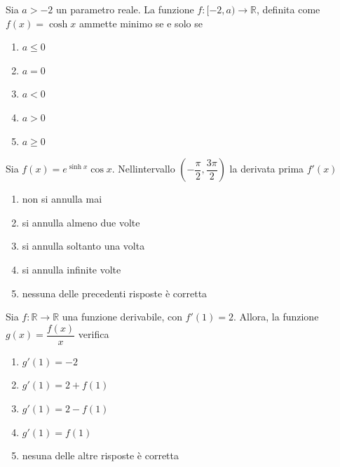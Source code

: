 \begin{quiz}
Sia $a>-2$ un parametro reale. La funzione $f:[-2,a)\to\mathbb R$, definita come $f(x)=\cosh x$ ammette minimo se e solo se
\begin{enumerate}
\item $a\le0$
\item $a=0$
\item $a<0$
\item $a>0$
\item $a\ge0$
\end{enumerate}
\end{quiz}

\begin{quiz}
Sia $f(x)=e^{\sinh x}\cos x$. Nell\textquotesingle intervallo $\left(-\dfrac\pi2,\dfrac{3\pi}2\right)$ la derivata prima $f\prime(x)$
\begin{enumerate}
\item non si annulla mai
\item si annulla almeno due volte
\item si annulla soltanto una volta
\item si annulla infinite volte
\item nessuna delle precedenti risposte \`e corretta
\end{enumerate}
\end{quiz}

\begin{quiz}
Sia $f:\mathbb R\to\mathbb R$ una funzione derivabile, con $f\prime(1)=2$. Allora, la funzione $g(x)=\dfrac{f(x)}x$ verifica
\begin{enumerate}
\item $g\prime(1)=-2$
\item $g\prime(1)=2+f(1)$
\item $g\prime(1)=2-f(1)$
\item $g\prime(1)=f(1)$
\item nesuna delle altre risposte \`e corretta
\end{enumerate}
\end{quiz}

